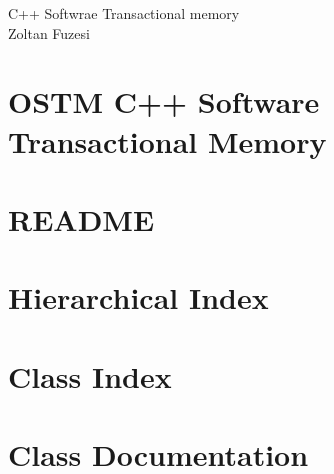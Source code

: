 \documentclass[twoside]{book}
\newcommand{\+}{\discretionary{\mbox{\scriptsize$\hookleftarrow$}}{}{}}
\newcommand{\clearemptydoublepage}{%
  \newpage{\pagestyle{empty}\cleardoublepage}%
}
\begin{document}
\begin{titlepage}
\vspace*{7cm}
\begin{center}%
{\Large C++ Softwrae Transactional memory }\\
\vspace*{1cm}
{\large Zoltan Fuzesi}\\
\end{center}
\end{titlepage}
\clearemptydoublepage
\tableofcontents
\clearemptydoublepage
{}

\chapter{O\+S\+TM C++ Software Transactional Memory}
\label{index}
\chapter{R\+E\+A\+D\+ME}
\label{md__media_zoltan_Data_00_2018_ITCarlow_00_Modules_06_Project_Documents_Git_Sync_Main_Tests_for_Linux_Test01_README}

\chapter{Hierarchical Index}

\chapter{Class Index}

\chapter{Class Documentation}


















\backmatter
\newpage
{}
\clearemptydoublepage
{}
\printindex
\end{document}
